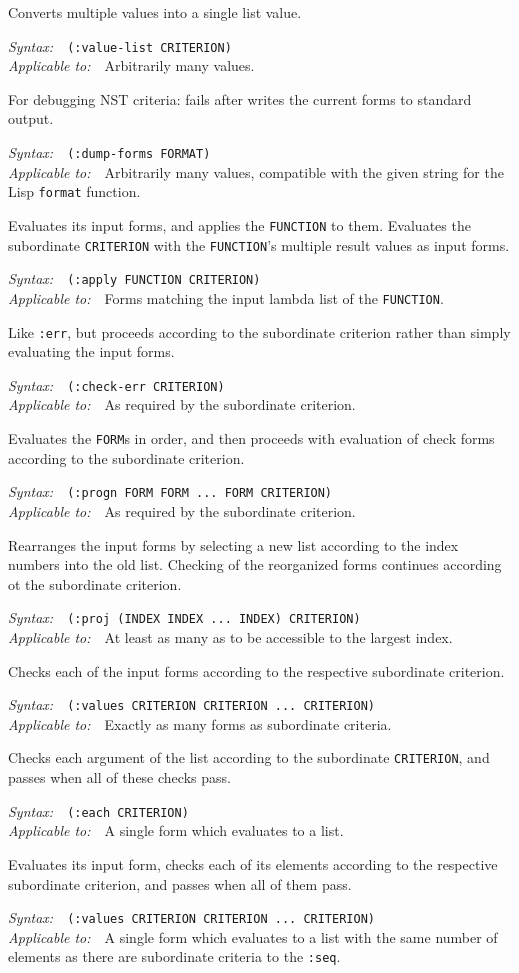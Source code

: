 \documentclass{article}
\newenvironment{criteria}%
{\begin{list}{}
    {\setlength{\labelwidth}{0pt}
     \setlength{\leftmargin}{2em}
     \setlength{\rightmargin}{1em}
     \setlength{\itemindent}{0em}}}%
  {\end{list}}
\def\criterion#1#2#3#4{\item[\bfseries #1] #4\par
  \emph{Syntax:}~~\texttt{#2}\\ \emph{Applicable to:}~~#3}
\begin{document}
\begin{criteria}

  \criterion{:value-list}
  {(:value-list CRITERION)}
  {Arbitrarily many values.}
  {Converts multiple values into a single list value.}

  \criterion{:dump-forms}{(:dump-forms FORMAT)} {Arbitrarily many
    values, compatible with the given string for the Lisp
    \texttt{format} function.}{For debugging NST criteria: fails after
    writes the current forms to standard output.}

  \criterion{:apply}{(:apply FUNCTION CRITERION)}{Forms matching the
    input lambda list of the \texttt{FUNCTION}.}{Evaluates its input
    forms, and applies the \texttt{FUNCTION} to them.  Evaluates the
    subordinate \texttt{CRITERION} with the \texttt{FUNCTION}'s
    multiple result values as input forms.}

  \criterion{:check-err}{(:check-err CRITERION)}{As required by the
    subordinate criterion.}{Like \texttt{:err}, but proceeds according
    to the subordinate criterion rather than simply evaluating the
    input forms.}

  \criterion{:progn}{(:progn FORM FORM ...\ FORM CRITERION)}{As
    required by the subordinate criterion.}{Evaluates the
    \texttt{FORM}s in order, and then proceeds with evaluation of
    check forms according to the subordinate criterion.}

  \criterion{:proj}{(:proj (INDEX INDEX ...\ INDEX) CRITERION)}{At
    least as many as to be accessible to the largest
    index.}{Rearranges the input forms by selecting a new list
    according to the index numbers into the old list.  Checking of the
    reorganized forms continues according ot the subordinate
    criterion.}

  \criterion{:values}{(:values CRITERION CRITERION ...\
    CRITERION)}{Exactly as many forms as subordinate criteria.}{Checks
    each of the input forms according to the respective subordinate
    criterion.}

  \criterion{:each}{(:each CRITERION)}{A single form which evaluates
    to a list.}{Checks each argument of the list according to the
    subordinate \texttt{CRITERION}, and passes when all of these
    checks pass.}

  \criterion{:seq}{(:values CRITERION CRITERION ...\ CRITERION)}{A
    single form which evaluates to a list with the same number of
    elements as there are subordinate criteria to the
    \texttt{:seq}.}{Evaluates its input form, checks each of its
    elements according to the respective subordinate criterion, and
    passes when all of them pass.}


\end{criteria}
\end{document}

